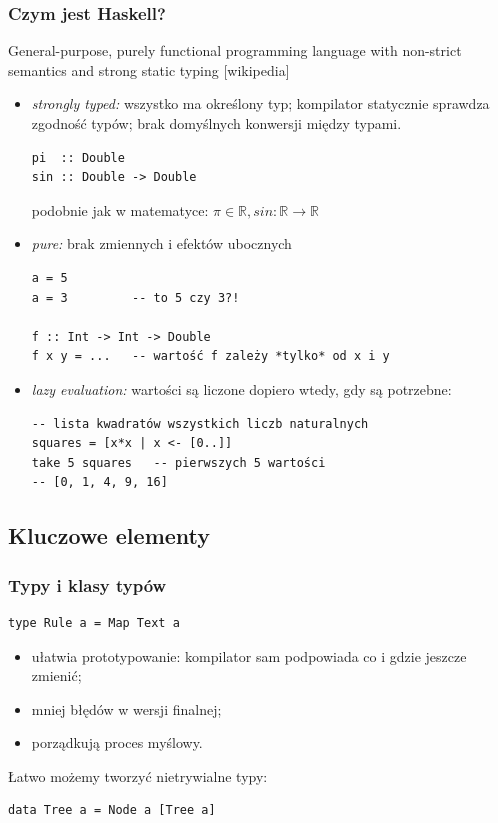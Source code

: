 \documentclass[8pt]{beamer}
\begin{document}
\begin{frame}[fragile]
  \frametitle{Czym jest Haskell?}
  General-purpose, purely functional programming language with non-strict
  semantics and strong static typing [wikipedia]
  \pause
  \begin{itemize}
  \item \emph{strongly typed:} wszystko ma określony typ;
    kompilator statycznie sprawdza zgodność typów;
    brak domyślnych konwersji między typami.
    \medskip
\begin{verbatim}
pi  :: Double
sin :: Double -> Double
\end{verbatim}
      {\footnotesize
      podobnie jak w matematyce:
      $\pi \in \mathbb{R}, sin\colon \mathbb{R} \to \mathbb {R}$}

  \pause
  \item \emph{pure:} brak zmiennych i efektów ubocznych
    \medskip
\begin{verbatim}
a = 5
a = 3         -- to 5 czy 3?!

f :: Int -> Int -> Double
f x y = ...   -- wartość f zależy *tylko* od x i y
\end{verbatim}

  \pause
  \item \emph{lazy evaluation:} wartości są liczone dopiero wtedy,
    gdy są potrzebne:
    \medskip
\begin{verbatim}
-- lista kwadratów wszystkich liczb naturalnych
squares = [x*x | x <- [0..]]
take 5 squares   -- pierwszych 5 wartości
-- [0, 1, 4, 9, 16]
\end{verbatim}
  \end{itemize}
\end{frame}

\subsection{Kluczowe elementy}

\begin{frame}
  \frametitle{Typy i klasy typów}
\begin{verbatim}
type Rule a = Map Text a
\end{verbatim}

  \begin{itemize}
  \item ułatwia prototypowanie: kompilator
    sam podpowiada co i gdzie jeszcze zmienić;
  \item mniej błędów w wersji finalnej;
  \item porządkują proces myślowy.
  \end{itemize}

  \pause

  Łatwo możemy tworzyć nietrywialne typy:

\begin{verbatim}
data Tree a = Node a [Tree a]
\end{verbatim}

\end{frame}
\end{document}
